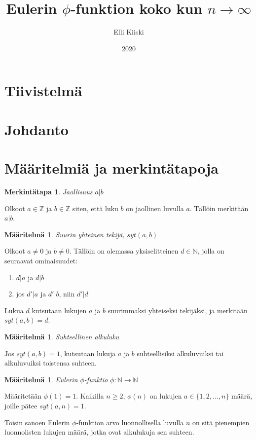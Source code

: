 \documentclass{article}
\title{Eulerin $\phi$-funktion koko kun $n \rightarrow \infty$}
\author{Elli Kiiski}
\date{2020}
\theoremstyle{definition}
\newtheorem{maaritelma}[subsection]{Määritelmä}
\newtheorem{merkinta}[subsection]{Merkintätapa}
\begin{document}
\maketitle

\newpage

\section{Tiivistelmä}

\section{Johdanto}

\section{Määritelmiä ja merkintätapoja}

\begin{merkinta}{\emph{Jaollisuus $a \vert b$}}

Olkoot $a \in \mathbb{Z}$ ja $b \in \mathbb{Z}$ siten, että luku $b$ on jaollinen luvulla $a$. Tällöin merkitään $a \vert b$.

\end{merkinta}

\begin{maaritelma}{\emph{Suurin yhteinen tekijä, $syt(a, b)$}}

Olkoot $a \not= 0$ ja $b \not= 0$. Tällöin on olemassa yksiselitteinen $d \in \mathbb{N}$, jolla on seuraavat ominaisuudet:

\begin{enumerate}
 \item $d \vert a$ ja $d \vert b$
 \item jos $d' \vert a$ ja $d' \vert b$, niin $d' \vert d$
\end{enumerate}

Lukua $d$ kutsutaan lukujen $a$ ja $b$ suurimmaksi yhteiseksi tekijäksi, ja merkitään $syt(a,b) = d$.

\end{maaritelma}

\begin{maaritelma}{\emph{Suhteellinen alkuluku}}

Jos $syt(a,b) = 1$, kutsutaan lukuja $a$ ja $b$ suhteellisiksi alkuluvuiksi tai alkuluvuiksi toistensa suhteen.

\end{maaritelma}

\begin{maaritelma}{\emph{Eulerin $\phi$-funktio $\phi: \mathbb{N} \rightarrow \mathbb{N}$}}

Määritetään $\phi(1) = 1$. Kaikilla $n \geq 2$, $\phi(n)$ on lukujen $a \in \{1,2,...,n\}$ määrä, joille pätee $syt(a,n) = 1$.

Toisin sanoen Eulerin $\phi$-funktion arvo luonnollisella luvulla $n$ on sitä pienempien luonnolisten lukujen määrä, jotka ovat alkulukuja sen suhteen.

\end{maaritelma}
\end{document}
